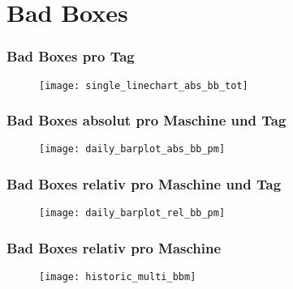 \section{Bad Boxes}
\begin{frame}
    \frametitle{Bad Boxes pro Tag}

    \begin{figure}
        \centering
        \texttt{[image: single\_linechart\_abs\_bb\_tot]}
    \end{figure}

\end{frame}

\begin{frame}
    \frametitle{Bad Boxes absolut pro Maschine und Tag}

    \begin{figure}
        \centering
        \texttt{[image: daily\_barplot\_abs\_bb\_pm]}
    \end{figure}

\end{frame}

\begin{frame}
    \frametitle{Bad Boxes relativ pro Maschine und Tag}

    \begin{figure}
        \centering
        \texttt{[image: daily\_barplot\_rel\_bb\_pm]}
    \end{figure}

\end{frame}

\begin{frame}
    \frametitle{Bad Boxes relativ pro Maschine}

    \begin{figure}
        \centering
        \texttt{[image: historic\_multi\_bbm]}
    \end{figure}

\end{frame}